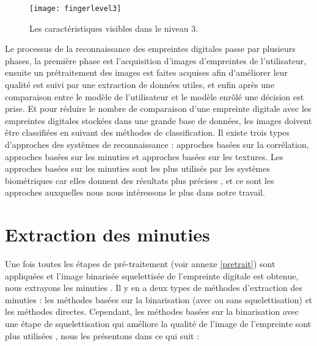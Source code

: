 \begin{enumerate}
	\begin{center}
		\begin{figure}[H]
			\centering
			\texttt{[image: fingerlevel3]}
			\caption{Les caractéristiques visibles dans le niveau 3.}
			\label{fig:chapitre2fingerprintlevel3}
		\end{figure}
	\end{center}
\end{enumerate}

Le processus de la reconnaissance des empreintes digitales passe par plusieurs phases, la première phase est l'acquisition d'images d'empreintes de l'utilisateur, ensuite un prétraitement des images est faites acquises afin d'améliorer leur qualité est suivi par une extraction de données utiles, et enfin après une comparaison entre le modèle de l'utilisateur et le modèle enrôlé une décision est prise. Et pour réduire le nombre de comparaison d'une empreinte digitale avec les empreintes digitales stockées dans une grande base de données, les images doivent être classifiées en suivant des méthodes de classification.
Il existe trois types d'approches des systèmes de reconnaissance : approches basées sur la corrélation, approches basées sur les minuties et approches basées sur les textures. 
Les approches basées sur les minuties sont les plus utilisés par les systèmes biométriques \citep{jiang2000fingerprint} car elles donnent des résultats plus précises \citep{o1998overview}, et ce sont les approches auxquelles nous nous intéressons le plus dans notre travail. 

\section{Extraction des minuties}
Une fois toutes les étapes de pré-traitement (voir annexe \ref{pretrait}) sont appliquées et l'image binarisée squelettisée de l'empreinte digitale est obtenue, nous extrayons les minuties \citep{tisse2001systeme}. Il y en a deux types de méthodes d'extraction des minuties : les méthodes basées sur la binarisation (avec ou sans squelettisation) et les méthodes directes. Cependant, les méthodes basées sur la binarisation avec une étape de squelettisation qui améliore la qualité de l'image de l'empreinte sont plus utilisées \citep{bansal2011minutiae}, nous les présentons dans ce qui suit :
